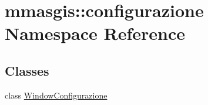 \hypertarget{namespacemmasgis_1_1configurazione}{
\section{mmasgis::configurazione Namespace Reference}
\label{namespacemmasgis_1_1configurazione}
}
\subsection*{Classes}
\begin{DoxyCompactItemize}
\item 
class \hyperlink{classmmasgis_1_1configurazione_1_1WindowConfigurazione}{WindowConfigurazione}
\end{DoxyCompactItemize}
